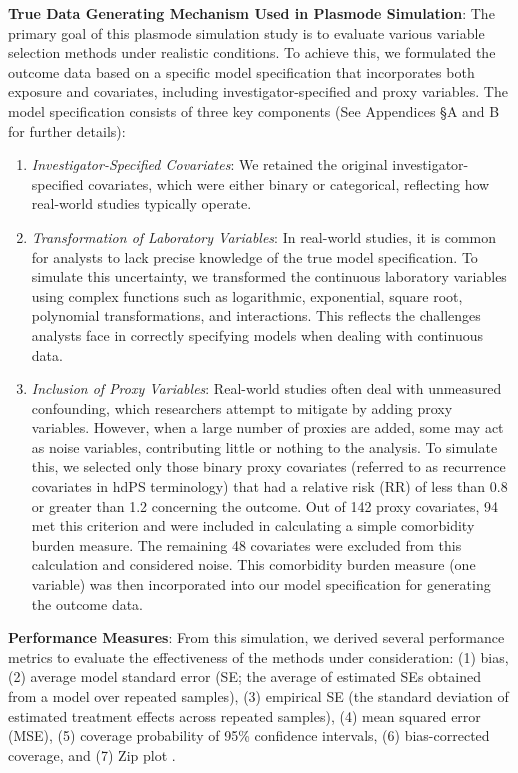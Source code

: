 \documentclass[sn-vancouver,Numbered,lineno,pdflatex]{sn-jnl}
\begin{document}
\textbf{True Data Generating Mechanism Used in Plasmode Simulation}: The
primary goal of this plasmode simulation study is to evaluate various
variable selection methods under realistic conditions. To achieve this,
we formulated the outcome data based on a specific model specification
that incorporates both exposure and covariates, including
investigator-specified and proxy variables. The model specification
consists of three key components (See Appendices \S A and B for further
details):

\begin{enumerate}
\def\labelenumi{\arabic{enumi}.}
\item
  \emph{Investigator-Specified Covariates}: We retained the original
  investigator-specified covariates, which were either binary or
  categorical, reflecting how real-world studies typically operate.
\item
  \emph{Transformation of Laboratory Variables}: In real-world studies,
  it is common for analysts to lack precise knowledge of the true model
  specification. To simulate this uncertainty, we transformed the
  continuous laboratory variables using complex functions such as
  logarithmic, exponential, square root, polynomial transformations, and
  interactions. This reflects the challenges analysts face in correctly
  specifying models when dealing with continuous data.
\item
  \emph{Inclusion of Proxy Variables}: Real-world studies often deal
  with unmeasured confounding, which researchers attempt to mitigate by
  adding proxy variables. However, when a large number of proxies are
  added, some may act as noise variables, contributing little or nothing
  to the analysis. To simulate this, we selected only those binary proxy
  covariates (referred to as recurrence covariates in hdPS terminology)
  that had a relative risk (RR) of less than 0.8 or greater than 1.2
  concerning the outcome. Out of 142 proxy covariates, 94 met this
  criterion and were included in calculating a simple comorbidity burden
  measure. The remaining 48 covariates were excluded from this
  calculation and considered noise. This comorbidity burden measure (one
  variable) was then incorporated into our model specification for
  generating the outcome data.
\end{enumerate}

\textbf{Performance Measures}: From this simulation, we derived several
performance metrics to evaluate the effectiveness of the methods under
consideration: (1) bias, (2) average model standard error (SE; the
average of estimated SEs obtained from a model over repeated samples),
(3) empirical SE (the standard deviation of estimated treatment effects
across repeated samples), (4) mean squared error (MSE), (5) coverage
probability of 95\% confidence intervals, (6) bias-corrected coverage,
and (7) Zip plot \citep{morris2019using, white2023check}.
\end{document}
